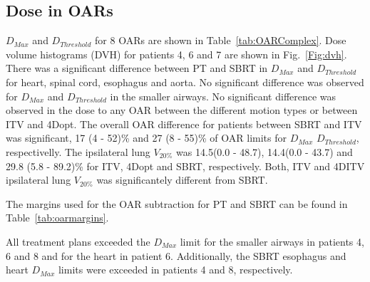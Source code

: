 \subsection{Dose in OARs}

$D_{Max}$ and $D_{Threshold}$ for 8 OARs are shown in Table~\ref{tab:OARComplex}. Dose volume histograms (DVH) for patients 4, 6 and 7 are shown in Fig.~\ref{Fig:dvh}.
There was a significant difference between PT and SBRT in $D_{Max}$ and $D_{Threshold}$ 
for heart, spinal cord, esophagus and aorta. No significant difference was observed for $D_{Max}$ and $D_{Threshold}$ in the smaller airways.
No significant difference was observed in the dose to any OAR between the different motion types or between ITV and 4Dopt.
The overall OAR difference for patients between SBRT and ITV
was significant, 17 (4 - 52)\% and 27 (8 - 55)\% of OAR limits for $D_{Max}$ $D_{Threshold}$, respectivelly.
The ipsilateral lung $V_{20\%}$ was 14.5(0.0 - 48.7), 14.4(0.0 - 43.7) and 29.8 (5.8 - 89.2)\% for ITV, 4Dopt and SBRT, respectively. Both, ITV and 4DITV ipsilateral lung $V_{20\%}$ was
significantely different from SBRT.

The margins used for the OAR subtraction for PT and SBRT can be found in Table~\ref{tab:oarmargins}.

All treatment plans exceeded the $D_{Max}$ limit for the smaller airways in patients 4, 6 and 8 and for the heart in patient 6. 
Additionally, the SBRT esophagus and heart $D_{Max}$ limits were exceeded in patients 4 and 8, respectively.


